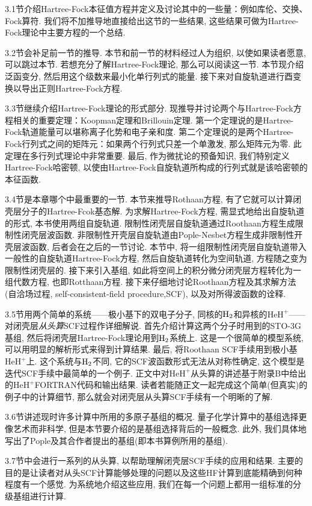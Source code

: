 3.1节介绍Hartree-Fock本征值方程并定义及讨论其中的一些量：例如库伦、交换、Fock算符. 我们将不加推导地直接给出这节的一些结果, 这些结果可做为Hartree-Fock理论中主要方程的一个总结.

3.2节会补足前一节的推导. 本节和前一节的材料经过人为组织, 以使如果读者愿意, 可以跳过本节. 若想充分了解Hartree-Fock理论, 那么可以阅读这一节. 本节现介绍泛函变分, 然后用这个级数来最小化单行列式的能量. 接下来对自旋轨道进行酉变换以导出正则Hartree-Fock方程.

3.3节继续介绍Hartree-Fock理论的形式部分. 现推导并讨论两个与Hartree-Fock方程相关的重要定理：Koopman定理和Brillouin定理. 第一个定理说的是Hartree-Fock轨道能量可以堪称离子化势和电子亲和度. 第二个定理说的是两个Hartree-Fock行列式之间的矩阵元：如果两个行列式只差一个单激发, 那么矩阵元为零. 此定理在多行列式理论中非常重要. 最后, 作为微扰论的预备知识, 我们特别定义Hartree-Fock哈密顿, 以使由Hartree-Fock自旋轨道所构成的行列式就是该哈密顿的本征函数.

3.4节是本章哪个中最重要的一节. 本节来推导Rothaan方程, 有了它就可以计算闭壳层分子的Hartree-Fcok基态解. 为求解Hartree-Fock方程, 需显式地给出自旋轨道的形式, 本书使用两组自旋轨道. 限制性闭壳层自旋轨道通过Roothaan方程生成限制性闭壳层波函数. 非限制性开壳层自旋轨道由Pople-Nesbet方程生成非限制性开壳层波函数, 后者会在之后的一节讨论. 本节中, 将一组限制性闭壳层自旋轨道带入一般性的自旋轨道Hartree-Fock方程, 然后自旋轨道转化为空间轨道, 方程随之变为限制性闭壳层的. 接下来引入基组, 如此将空间上的积分微分闭壳层\hft 方程转化为一组代数方程, 也即Rotthaan方程. 接下来仔细地讨论Roothaan方程及其求解方法(自洽场过程, self-consistent-field procedure,SCF), 以及对所得波函数的诠释.

3.5节用两个简单的系统——极小基下的双电子分子, 同核的$\mathrm{H}_2$和异核的$\mathrm{HeH}^+$——对闭壳层\emph{从头算}SCF过程作详细解说. 首先介绍计算这两个分子时用到的STO-3G基组, 然后将闭壳层Hartree-Fock理论用到$\mathrm{H}_2$系统上. 这是一个很简单的模型系统, 可以用明显的解析形式来得到计算结果. 最后, 将Roothaan SCF手续用到极小基$\mathrm{HeH}^+$上. 这个系统与$\mathrm{H}_2$不同, 它的SCF波函数形式无法从对称性确定, 这个模型是迭代SCF手续中最简单的一个例子. 正文中对$\mathrm{HeH}^+$从头算的讲述基于附录B中给出的$\mathrm{HeH}^+$FORTRAN代码和输出结果. 读者若能随正文一起完成这个简单(但真实)的例子中的计算细节, 那么就会对闭壳层从头算SCF手续有一个明晰的了解.

3.6节讲述现时许多计算中所用的多原子基组的概况. 量子化学计算中的基组选择更像艺术而非科学, 但是本节要介绍的是基组选择背后的一般概念. 此外, 我们具体地写出了Pople及其合作者提出的基组(即本书算例所用的基组).  

3.7节中会进行一系列的从头算, 以帮助理解闭壳层SCF手续的应用和结果. 主要的目的是让读者对从头SCF计算能够处理的问题以及这些HF计算到底能精确到何种程度有一个感觉. 为系统地介绍这些应用, 我们在每一个问题上都用一组标准的分级基组进行计算.


